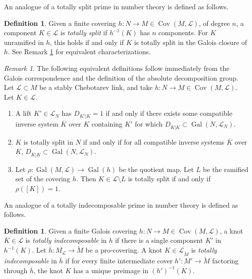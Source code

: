 \documentclass{amsart}
\theoremstyle{plain}
\theoremstyle{definition}
\newtheorem{Def}[theorem]{Definition}
\theoremstyle{plain}
\theoremstyle{plain}
\theoremstyle{plain}
\theoremstyle{remark}
\newtheorem{remark}[theorem]{Remark}
\theoremstyle{remark}
\theoremstyle{plain}
\theoremstyle{definition}
\theoremstyle{plain}
\DeclareMathOperator{\Gal}{\mathrm{Gal}}
\DeclareMathOperator{\Cov}{\mathrm{Cov}}
\theoremstyle{plain}
\theoremstyle{plain}
\numberwithin{equation}{section}
\begin{document}
An analogue of a totally split prime in number theory is defined as follows. 

\begin{Def}\label{def:totsplit}
Given a finite covering $h: N \to M \in \Cov(M, \mathcal{L})$, of degree $n$, a component $K \in \mathcal{L}$ is \emph{totally split} if $h^{-1}(K)$ has $n$ components. For $K$ unramified in $h$, this holds if and only if $K$ is totally split in the Galois closure of $h$. See Remark \ref{lma:totsplit} for equivalent characterizations.
\end{Def}

\begin{remark}\label{lma:totsplit}
The following equivalent definitions follow immediately from the Galois correspondence and the definition of the absolute decomposition group. Let $\mathcal{L} \subset M$ be a stably Chebotarev link, and take $h: N \to M \in \Cov(M, \mathcal{L})$. Let $K \in \mathcal{L}$. 
\begin{enumerate}
    \item A lift $K' \in \mathcal{L}_N$ has $D_{K'|K} = 1$ if and only if there exists some compatible inverse system $\overline{K}$ over $K$ containing $K'$ for which $D_{\overline{K}|K} \subset \Gal(N, \mathcal{L}_N)$.
    \item $K$ is totally split in $N$ if and only if for all compatible inverse systems $\overline{K}$ over $K$, $D_{\overline{K}|K} \subset \Gal(N, \mathcal{L}_N)$.
    \item Let $\rho: \Gal(M, \mathcal{L}) \to \Gal(h)$ be the quotient map. Let $L$ be the ramified set of the covering $h$. Then $K \in \mathcal{L} \setminus L$ is totally split if and only if $\rho([K]) = 1$.
\end{enumerate} 
\end{remark}

An analogue of a totally indecomposable prime in number theory is defined as follows. 

\begin{Def}
Given a finite Galois covering $h: N \to M \in \Cov(M, \mathcal{L})$, a knot $K \in \mathcal{L}$ is \emph{totally indecomposable} in $h$ if there is a single component $K'$ in $h^{-1}(K)$. 
Let $\overline{h}: \overline{M_{\mathcal{L}}} \to \widetilde{M}$ be a pro-covering. A knot $K \in \mathcal{L}_{\widetilde M}$ is \emph{totally indecomposable} in $\overline{h}$ if for every finite intermediate cover $h': M' \to \widetilde{M}$ factoring through $\overline{h}$, the knot $K$ has a unique preimage in $(h')^{-1}(K)$.
\end{Def}
\end{document}
